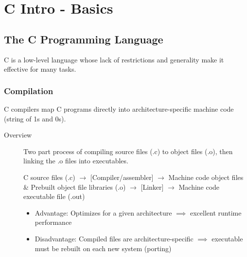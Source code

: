 \chapter{C Intro - Basics}

\section{The C Programming Language}
C is a low-level language whose lack of restrictions and generality make it effective for many tasks.

\subsection{Compilation}
C compilers map C programs directly into architecture-specific machine code (string of 1s and 0s).

\begin{description}
    \item[Overview] Two part process of compiling source files (.c) to object files (.o), then linking the .o files into executables.

    C source files (.c) \(\rightarrow\) [Compiler/assembler] \(\rightarrow\) Machine code object files \& Prebuilt object file libraries (.o) \(\rightarrow\) [Linker] \(\rightarrow\) Machine code executable file (.out)
    
    \begin{itemize}
        \item Advantage: Optimizes for a given architecture \(\implies\) excellent runtime performance
        \item Disadvantage: Compiled files are architecture-specific \(\implies\) executable must be rebuilt on each new system (porting)
    \end{itemize}
\end{description}


